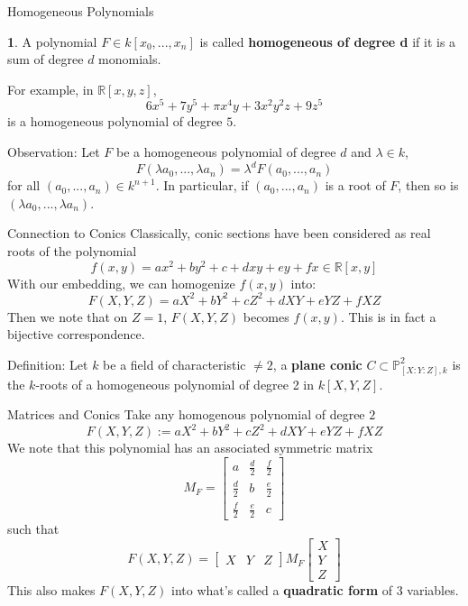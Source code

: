 \documentclass[hyperref, notheorems]{beamer}
\newcommand{\Rbb}{\mathbb{R}}
\newcommand{\Pbb}{\mathbb{P}}
\theoremstyle{definition}
\newtheorem{definition}{\translate{Definition}}
\begin{document}
\begin{frame}{Homogeneous Polynomials}
    
    \begin{definition}
    A polynomial $F \in k[x_0, ..., x_n]$ is called \textbf{homogeneous of degree d} if it is a sum of degree $d$ monomials.
    \end{definition}
    For example, in $\Rbb[x, y, z]$, 
    \[6x^5 + 7y^5 + \pi x^4y + 3x^2y^2z + 9z^5\]
    is a homogeneous polynomial of degree $5$.
    
    \begin{block}{Observation:}
    Let $F$ be a homogeneous polynomial of degree $d$ and $\lambda \in k$,
    \[F(\lambda a_0, ..., \lambda a_n) =  \lambda^d F(a_0, ..., a_n)\]
    for all $(a_0, ..., a_n) \in k^{n+1}$. In particular, if $(a_0, ..., a_n)$ is a root of $F$, then so is $(\lambda a_0, ..., \lambda a_n)$.
    \end{block}
\end{frame}

\begin{frame}{Connection to Conics}
    Classically, conic sections have been considered as real roots of the polynomial
    \[f(x,y) = ax^2 + by^2 + c + dxy + ey + fx \in \Rbb[x, y]\]
    With our embedding, we can homogenize $f(x, y)$ into:
    \[F(X, Y, Z) = aX^2 + bY^2 + cZ^2 + dXY + eYZ + fXZ\]
    Then we note that on $Z = 1$, $F(X, Y, Z)$ becomes $f(x, y)$. This is in fact a bijective correspondence.
    
    \begin{block}{Definition:}
    Let $k$ be a field of characteristic $\neq 2$, a \textbf{plane conic} $C \subset \Pbb^2_{[X:Y:Z], k}$ is the $k$-roots of a homogeneous polynomial of degree 2 in $k[X, Y, Z]$.
    \end{block}
\end{frame}


\begin{frame}{Matrices and Conics}
Take any homogenous polynomial of degree $2$
\[F(X, Y, Z) := aX^2 + bY^2 + cZ^2 + dXY + eYZ + fXZ\]
We note that this polynomial has an associated symmetric matrix
\[M_F = \begin{bmatrix}
a & \frac{d}{2} & \frac{f}{2}\\
\frac{d}{2} & b & \frac{e}{2}\\
\frac{f}{2} & \frac{e}{2} & c
\end{bmatrix}\]
such that
\[F(X, Y, Z) = \begin{bmatrix} 
X & Y & Z
\end{bmatrix}
M_F
\begin{bmatrix} 
X\\
Y\\
Z
\end{bmatrix}\]
This also makes $F(X, Y, Z)$ into what's called a \textbf{quadratic form} of 3 variables.
\end{frame}
\end{document}
